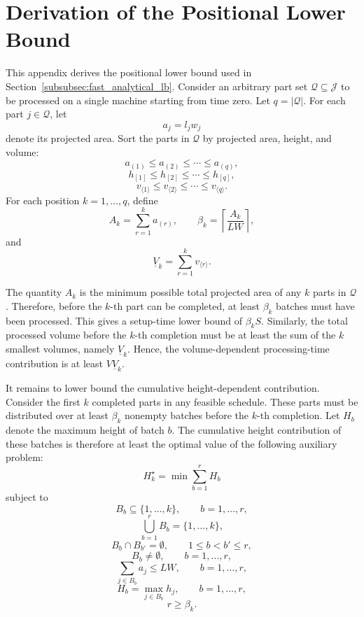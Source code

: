 \documentclass[review,3p,times,authoryear]{elsarticle}
\begin{document}






\appendix
\section{Derivation of the Positional Lower Bound}
\label{app:positional_lb}

This appendix derives the positional lower bound used in
Section~\ref{subsubsec:fast_analytical_lb}. Consider an arbitrary part set
$\mathcal{Q}\subseteq\mathcal{J}$ to be processed on a single machine
starting from time zero. Let $q=|\mathcal{Q}|$. For each part
$j\in\mathcal{Q}$, let
\[
a_j=l_jw_j
\]
denote its projected area. Sort the parts in $\mathcal{Q}$ by projected
area, height, and volume:
\[
a_{(1)} \le a_{(2)} \le \cdots \le a_{(q)},
\]
\[
h_{[1]} \le h_{[2]} \le \cdots \le h_{[q]},
\]
\[
v_{\langle 1\rangle} \le v_{\langle 2\rangle}
\le \cdots \le v_{\langle q\rangle}.
\]
For each position $k=1,\dots,q$, define
\[
A_k=\sum_{r=1}^{k}a_{(r)},
\qquad
\beta_k=\left\lceil\frac{A_k}{LW}\right\rceil,
\]
and
\[
\underline{V}_k=\sum_{r=1}^{k}v_{\langle r\rangle}.
\]

The quantity $A_k$ is the minimum possible total projected area of any
$k$ parts in $\mathcal{Q}$. Therefore, before the $k$-th part can be
completed, at least $\beta_k$ batches must have been processed. This gives
a setup-time lower bound of $\beta_k S$. Similarly, the total processed
volume before the $k$-th completion must be at least the sum of the
$k$ smallest volumes, namely $\underline{V}_k$. Hence, the volume-dependent
processing-time contribution is at least $V\underline{V}_k$.

It remains to lower bound the cumulative height-dependent contribution.
Consider the first $k$ completed parts in any feasible schedule. These
parts must be distributed over at least $\beta_k$ nonempty batches before
the $k$-th completion. Let $H_b$ denote the maximum height of batch $b$.
The cumulative height contribution of these batches is therefore at least
the optimal value of the following auxiliary problem:
\[
H_k^{\star}
=
\min
\sum_{b=1}^{r}H_b
\]
subject to
\[
B_b\subseteq\{1,\dots,k\},\qquad b=1,\dots,r,
\]
\[
\bigcup_{b=1}^{r}B_b=\{1,\dots,k\},
\]
\[
B_b\cap B_{b'}=\emptyset,\qquad 1\le b<b'\le r,
\]
\[
B_b\neq\emptyset,\qquad b=1,\dots,r,
\]
\[
\sum_{j\in B_b}a_j\le LW,\qquad b=1,\dots,r,
\]
\[
H_b=\max_{j\in B_b}h_j,\qquad b=1,\dots,r,
\]
\[
r\ge \beta_k.
\]
\end{document}

